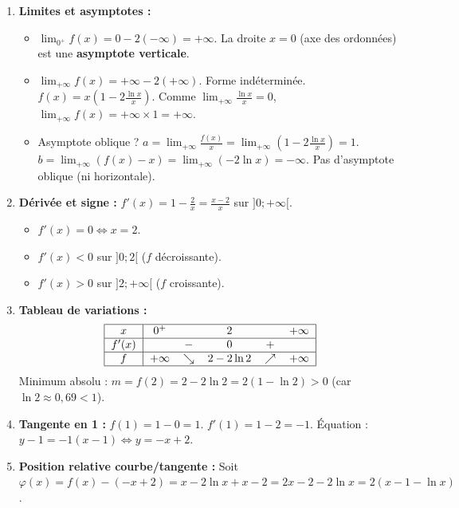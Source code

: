 \documentclass[11pt]{article}
\begin{document}
\begin{corrige}[Exercice 9 — Étude complète : $f(x) = x - 2\ln x$ (Type Probatoire C/E)]
\begin{enumerate}
    \item \textbf{Limites et asymptotes :}
    \begin{itemize}
        \item $\lim_{0^+} f(x) = 0 - 2(-\infty) = +\infty$. La droite $x=0$ (axe des ordonnées) est une \textbf{asymptote verticale}.
        \item $\lim_{+\infty} f(x) = +\infty - 2(+\infty)$. Forme indéterminée. $f(x) = x\left(1 - 2\frac{\ln x}{x}\right)$. Comme $\lim_{+\infty} \frac{\ln x}{x} = 0$, $\lim_{+\infty} f(x) = +\infty \times 1 = +\infty$.
        \item Asymptote oblique ? $a = \lim_{+\infty} \frac{f(x)}{x} = \lim_{+\infty} \left(1 - 2\frac{\ln x}{x}\right) = 1$.
        $b = \lim_{+\infty} (f(x) - x) = \lim_{+\infty} (-2\ln x) = -\infty$.
        Pas d'asymptote oblique (ni horizontale).
    \end{itemize}
    \item \textbf{Dérivée et signe :}
    $f'(x) = 1 - \frac{2}{x} = \frac{x-2}{x}$ sur $]0;+\infty[$.
    \begin{itemize}
        \item $f'(x) = 0 \iff x=2$.
        \item $f'(x) < 0$ sur $]0;2[$ ($f$ décroissante).
        \item $f'(x) > 0$ sur $]2;+\infty[$ ($f$ croissante).
    \end{itemize}
    \item \textbf{Tableau de variations :}
    \[
    \begin{tabular}{|c|ccccc|}\hline
    $x$ & $0^+$ & & $2$ & & $+\infty$ \\ \hline
    $f'(x)$ & & $-$ & $0$ & $+$ & \\ \hline
    $f$ & $+\infty$ & $\searrow$ & $2-2\ln 2$ & $\nearrow$ & $+\infty$ \\ \hline
    \end{tabular}
    \]
    Minimum absolu : $m = f(2) = 2 - 2\ln 2 = 2(1-\ln 2) > 0$ (car $\ln 2 \approx 0,69 < 1$).
    \item \textbf{Tangente en 1 :}
    $f(1) = 1 - 0 = 1$. $f'(1) = 1 - 2 = -1$.
    Équation : $y - 1 = -1(x-1) \iff \boxed{y = -x + 2}$.
    \item \textbf{Position relative courbe/tangente :}
    Soit $\varphi(x) = f(x) - (-x+2) = x - 2\ln x + x - 2 = 2x - 2 - 2\ln x = 2(x-1-\ln x)$.

\end{enumerate}
\end{corrige}
\end{document}
